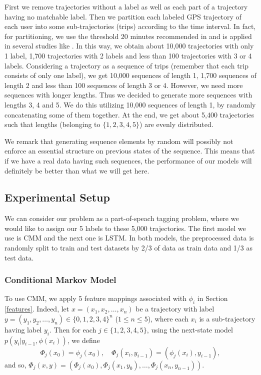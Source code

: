 \documentclass[11pt]{myclass}
\begin{document}
First we remove trajectories without a label as well as each part of a trajectory having no matchable label. Then we partition each labeled GPS trajectory of each user into some sub-trajectories (trips) according to the time interval. In fact, for partitioning, we use the threshold 20 minutes recommended in \cite{ZLWX} and is applied in several studies like \cite{DH2018, DCHR2020}. In this way, we obtain about 10,000 trajectories with only 1 label, 1,700 trajectories with 2 labels and less than 100 trajectories with 3 or 4 labels. Considering a trajectory as a sequence of trips (remember that each trip consists of only one label), we get 10,000 sequences of length 1, 1,700 sequences of length 2 and less than 100 sequences of length 3 or 4. However, we need more sequences with longer lengths. Thus we decided to generate more sequences with lengths 3, 4 and 5. We do this utilizing 10,000 sequences of length 1, by randomly concatenating some of them together. At the end, we get about 5,400 trajectories such that lengths (belonging to $\{1,2,3,4,5\}$) are evenly distributed. 

We remark that generating sequence elements by random will possibly not enforce an essential structure on previous states of the sequence. This means that if we have a real data having such sequences, the performance of our models will definitely be better than what we will get here. 

\subsection{Experimental Setup}
We can consider our problem as a part-of-speach tagging problem, where we would like to assign our 5 labels to these 5,000 trajectories. The first model we use is CMM and the next one is LSTM. In both models, the preprocessed data is randomly split to train and test datasets by 2/3 of data as train data and 1/3 as test data. 

\subsubsection{Conditional Markov Model} 
To use CMM, we apply 5 feature mappings associated with $\phi_i$ in Section \ref{features}. Indeed, let $x = (x_1, x_2, \ldots, x_n)$ be a trajectory with label $y = (y_1, y_2, \ldots, y_n) \in \{0,1,2,3,4\}^n$ ($1\leq n \leq 5$), where each $x_i$ is a sub-trajectory having label $y_i$. Then for each $j \in \{1,2,3,4,5\}$, using the next-state model $p(y_i | y_{i-1}, \phi(x_i))$, we define 
\[
\Phi_j(x_0) = \phi_j(x_0), \quad \Phi_j(x_i, y_{i-1}) = (\phi_j(x_i), y_{i-1}), 
\] 
and so, $\Phi_j(x, y) = (\Phi_j(x_0), \Phi_j(x_1, y_0), \ldots, \Phi_j(x_n, y_{n-1}))$. 
\end{document}
